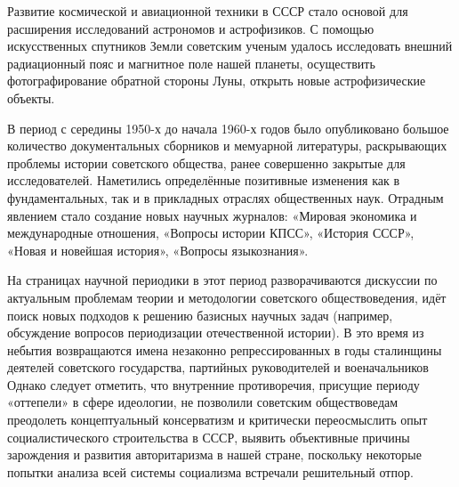 \documentclass{article}
\begin{document}
\hfill

Развитие космической и авиационной техники в СССР стало основой для расширения исследований астрономов и астрофизиков. С помощью искусственных спутников Земли советским ученым удалось исследовать внешний радиационный пояс и магнитное поле нашей планеты, осуществить фотографирование обратной стороны Луны, открыть новые астрофизические объекты.

\hfill

В период с середины 1950-х до начала 1960-х годов было опубликовано большое количество документальных сборников и мемуарной литературы, раскрывающих проблемы истории советского общества, ранее совершенно закрытые для исследователей. Наметились определённые позитивные изменения как в фундаментальных, так и в прикладных отраслях общественных наук. Отрадным явлением стало создание новых научных журналов: «Мировая экономика и международные отношения, «Вопросы истории КПСС», «История СССР», «Новая и новейшая история», «Вопросы языкознания».

\hfill

На страницах научной периодики в этот период разворачиваются дискуссии по актуальным проблемам теории и методологии советского обществоведения, идёт поиск новых подходов к решению базисных научных задач (например, обсуждение вопросов периодизации отечественной истории). В это время из небытия возвращаются имена незаконно репрессированных в годы сталинщины деятелей советского государства, партийных руководителей и военачальников Однако следует отметить, что внутренние противоречия, присущие периоду «оттепели» в сфере идеологии, не позволили советским обществоведам преодолеть концептуальный консерватизм и критически переосмыслить опыт социалистического строительства в СССР, выявить объективные причины зарождения и развития авторитаризма в нашей стране, поскольку некоторые попытки анализа всей системы социализма встречали решительный отпор.
\end{document}
